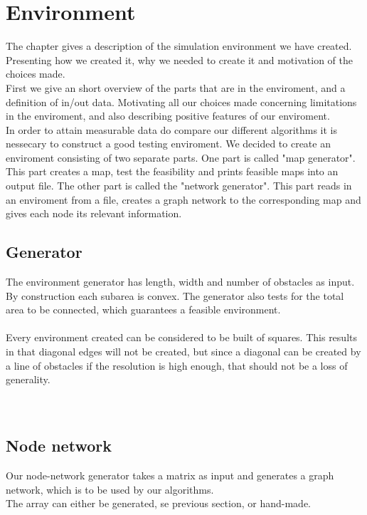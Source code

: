 \chapter{Environment}
The chapter gives a description of the simulation environment we have created. Presenting how we created it, why we needed to create it and motivation of the choices made.\\
First we give an short overview of the parts that are in the enviroment, and a definition of in/out data. Motivating all our choices made concerning limitations in the enviroment, and also describing positive features of our enviroment.
\\
In order to attain measurable data do compare our different algorithms it is nessecary to construct a good testing enviroment. We decided to create an enviroment consisting of two separate parts. One part is called "map generator". This part creates a map, test the feasibility and prints feasible maps into an output file. The other part is called the "network generator". This part reads in an enviroment from a file, creates a graph network to the corresponding map and gives each node its relevant information. 
\\
\section{Generator}
The environment generator has length, width and number of obstacles as input. By construction each subarea is convex. The generator also tests for the total area to be connected, which guarantees a feasible environment.\\
\\
Every environment created can be considered to be built of squares. This results in that diagonal edges will not be created, but since a diagonal can be created by a line of obstacles if the resolution is high enough, that should not be a loss of generality. \\
\\
\\
\section{Node network}
Our node-network generator takes a matrix as input and generates a graph network, which is to be used by our algorithms.\\
The array can either be generated, se previous section, or hand-made.\\